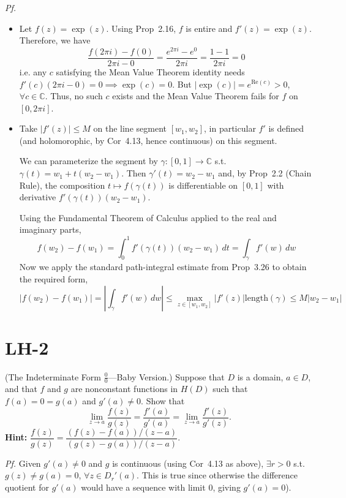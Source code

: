 \documentclass[a4paper]{article}
\begin{document}
\textit{Pf.} \begin{itemize}
\item[\textbf{(a)}] Let $f(z) = \exp(z)$. Using Prop~2.16, $f$ is entire and $f'(z) = \exp(z)$. Therefore, we have
\[
\frac{f(2\pi i) - f(0)}{2\pi i - 0} = \frac{e^{2\pi i} - e^0}{2\pi i} = \frac{1 - 1}{2 \pi i} = 0
\]
i.e. any $c$ satisfying the Mean Value Theorem identity needs $f'(c) (2\pi i - 0) = 0 \implies \exp(c) = 0$. But $|\exp(c)| = e^{\mathrm{Re}(c)} > 0$, $
\forall c \in \mathbb{C}$. Thus, no such $c$ exists and the Mean Value Theorem fails for $f$ on $[0, 2\pi i]$.

\item[\textbf{(b)}] Take $|f'(z)| \leq M$ on the line segment $[w_1, w_2]$, in particular $f'$ is defined (and holomorophic, by Cor~4.13, hence continuous) on this segment. 

We can parameterize the segment by $\gamma : [0,1] \to \mathbb{C}$ s.t. $\gamma(t) = w_1 + t(w_2 - w_1)$. Then $\gamma'(t) = w_2 - w_1$ and, by Prop~2.2 (Chain Rule), the composition $t \mapsto f(\gamma(t))$ is differentiable on $[0,1]$ with derivative $f'(\gamma(t))(w_2 - w_1)$.

Using the Fundamental Theorem of Calculus applied to the real and imaginary parts,
\[
f(w_2) - f(w_1) = \int_0^1 f'(\gamma(t))(w_2 - w_1)\, dt = \int_\gamma f'(w)\, dw
\]
Now we apply the standard path-integral estimate from Prop~3.26 to obtain the required form,
\[
|f(w_2) - f(w_1)| 
= \left| \int_\gamma f'(w)\, dw \right|
\leq \max_{z \in [w_1,w_2]} |f'(z)| \mathrm{length}(\gamma)
\leq M |w_2 - w_1|
\]
\end{itemize}
\newpage
\section*{LH-2}

\begin{tcolorbox}[colback=gray!10, colframe=black, boxrule=0.5pt, arc=2mm]
(The Indeterminate Form $\frac{0}{0}$---Baby Version.) Suppose that $D$ is a domain, $a \in D$, and that $f$ and $g$ are nonconstant functions in $H(D)$ such that $f(a) = 0 = g(a)$ and $g'(a) \neq 0$. Show that
\[
\lim_{z \to a} \frac{f(z)}{g(z)} = \frac{f'(a)}{g'(a)} = \lim_{z \to a} \frac{f'(z)}{g'(z)}.
\]
\textbf{Hint:} $\dfrac{f(z)}{g(z)} = \dfrac{(f(z) - f(a))/(z-a)}{(g(z) - g(a))/(z-a)}$.
\end{tcolorbox}

\textit{Pf.} Given $g'(a) \neq 0$ and $g$ is continuous (using Cor~4.13 as above), $\exists r > 0$ s.t. $g(z) \neq g(a) = 0$, $\forall z \in D_r'(a)$. This is true since otherwise the difference quotient for $g'(a)$ would have a sequence with limit $0$, giving $g'(a) = 0$). 
\end{document}
